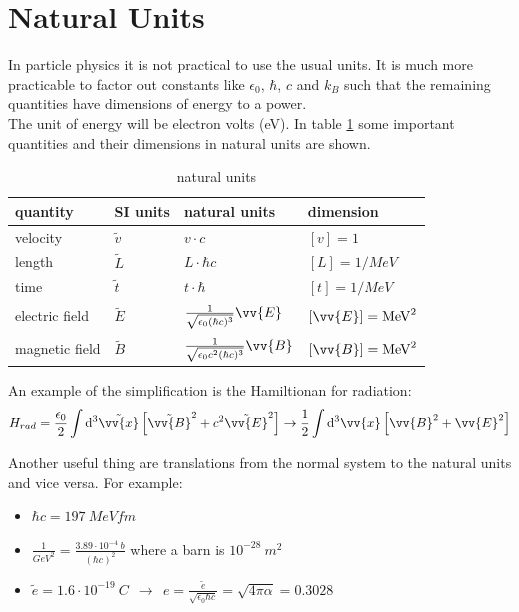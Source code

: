 \documentclass{include/thesisclass}
\newcommand{\cc}{\cdot}
\newcommand{\vx}{\vv{x}}
\newcommand{\df}{\rightarrow}
\newcommand{\dd}{{\rm d}}
\newcommand{\vB}{\vv{E}}
\newcommand{\vE}{\vv{B}}
\newcommand{\eps}{\epsilon}
\begin{document}
\section{Natural Units}
In particle physics it is not practical to use the usual units. It is much more practicable to factor out constants like $\eps_0$, $\hbar$, $c$ and $k_B$ such that the remaining quantities have dimensions of energy to a power.\\
The unit of energy will be electron volts (eV). In table \ref{units} some important quantities and their dimensions in natural units are shown.
\begin{table}[H]
\centering
\begin{tabular}{l|lll}
quantity & SI units & natural units & dimension\\
\midrule
velocity & $\tilde{v}$ & $v \cc c$ & $[v] = 1$\\
length & $\tilde{L}$ & $L \cc \hbar c$ & $[L] = 1/\si{MeV}$\\
time & $\tilde{t}$ & $t\cc \hbar$ & $[t] = 1/\si{MeV}$\\
electric field & $\tilde{E}$ & $\frac{1}{\sqrt{\eps_0 (\hbar c)^3}} \vv{E}$ & $[\vv{E}] = \si{MeV}^2$\\
magnetic field & $\tilde{B}$ & $\frac{1}{\sqrt{\eps_0 c^2(\hbar c)^3}} \vv{B}$ &  $[\vv{B}] = \si{MeV}^2$\\
\bottomrule
\end{tabular}
\caption{natural units}
\label{units}
\end{table}
An example of the simplification is the Hamiltionan for radiation:
\[ H_{rad} = \frac{\eps_0}{2} \int\dd^3 \tilde{\vx} \left[ \tilde{\vE}^2 + c^2 \tilde{\vB}^2\right] \df \frac{1}{2} \int\dd^3 \vx \left[\vE^2 + \vB^2\right]\]

Another useful thing are translations from the normal system to the natural units and vice versa. For example:
\begin{itemize}
\item $\hbar c = 197~\si{MeV fm}$
\item $\frac{1}{\si{GeV}^2} = \frac{3.89\cc 10^{-4}~\si{b}}{(\hbar c)^2}$ where a barn is $10^{-28}~\si{m^2}$
\item $\tilde{e} = 1.6\cc 10^{-19} ~\si{C} ~~\df~~ e = \frac{\tilde{e}}{\sqrt{\eps_0 \hbar c}} = \sqrt{ 4 \pi \alpha} = 0.3028$
\end{itemize}
\end{document}
